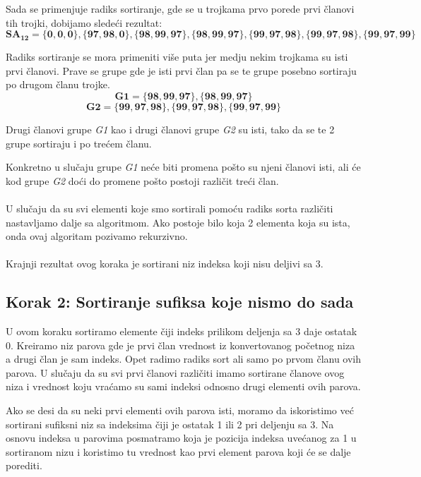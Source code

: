 \documentclass{article}
\begin{document}
Sada se primenjuje radiks sortiranje, gde se u trojkama prvo porede prvi članovi tih trojki, dobijamo sledeći rezultat:
\begin{equation}
\mathbf{SA_{12} =  \{0, 0, 0\}, \{97, 98, 0\} ,\{98, 99, 97\}, \{98, 99, 97\}, \{99, 97, 98\} , \{99, 97, 98\} , \{99, 97, 99\} }
\end{equation}

Radiks sortiranje se mora primeniti više puta jer medju nekim trojkama su isti prvi članovi. Prave se grupe gde je isti prvi član pa se te grupe posebno sortiraju po drugom članu trojke.
\begin{equation}
\mathbf{G1 = \{98, 99, 97\}, \{98, 99, 97\}}
\end{equation}
\begin{equation}
\mathbf{G2 = \{99, 97, 98\} , \{99, 97, 98\} , \{99, 97, 99\}}
\end{equation}

Drugi članovi grupe \textit{G1} kao i drugi članovi grupe \textit{G2} su isti, tako da se te 2 grupe sortiraju i po trećem članu.

Konkretno u slučaju grupe \textit{G1} neće biti promena pošto su njeni članovi isti, ali će kod grupe \textit{G2} doći do promene pošto postoji različit treći član.\\\\


U slučaju da su svi elementi koje smo sortirali pomoću radiks sorta različiti nastavljamo dalje sa algoritmom. Ako postoje bilo koja 2 elementa koja su ista, onda ovaj algoritam pozivamo rekurzivno.\\\\

Krajnji rezultat ovog koraka je sortirani niz indeksa koji nisu deljivi sa 3.

\subsection{Korak 2: Sortiranje sufiksa koje nismo do sada}
U ovom koraku sortiramo elemente čiji indeks prilikom deljenja sa 3 daje ostatak 0.
Kreiramo niz parova gde je prvi član vrednost iz konvertovanog početnog niza a drugi član je sam indeks.
Opet radimo radiks sort ali samo po prvom članu ovih parova. U slučaju da su svi prvi članovi različiti imamo sortirane članove ovog niza i vrednost koju vraćamo su sami indeksi odnosno drugi elementi ovih parova.

Ako se desi da su neki prvi elementi ovih parova isti, moramo da iskoristimo već sortirani sufiksni niz sa indeksima čiji je ostatak 1 ili 2 pri deljenju sa 3. Na osnovu indeksa u parovima posmatramo koja je pozicija indeksa uvećanog za 1 u sortiranom nizu i koristimo tu vrednost kao prvi element parova koji će se dalje porediti.
\end{document}
